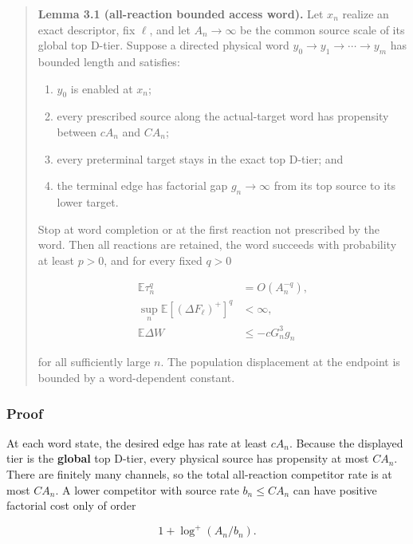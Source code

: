 \begin{quote}
\textbf{Lemma 3.1 (all-reaction bounded access word).} Let \(x_n\)
realize an exact descriptor, fix \(\ell\), and let \(A_n\to\infty\) be
the common source scale of its global top D-tier. Suppose a directed
physical word \(y_0\to y_1\to\cdots\to y_m\) has bounded length and
satisfies:

\begin{enumerate}
\def\labelenumi{\arabic{enumi}.}
\tightlist
\item
  \(y_0\) is enabled at \(x_n\);
\item
  every prescribed source along the actual-target word has propensity
  between \(cA_n\) and \(CA_n\);
\item
  every preterminal target stays in the exact top D-tier; and
\item
  the terminal edge has factorial gap \(g_n\to\infty\) from its top
  source to its lower target.
\end{enumerate}

Stop at word completion or at the first reaction not prescribed by the
word. Then all reactions are retained, the word succeeds with
probability at least \(p>0\), and for every fixed \(q>0\)

\[
\begin{aligned}
 \mathbb E\tau_n^q&=O(A_n^{-q}),\\
 \sup_n\mathbb E[(\Delta F_\ell)^+]^q&<\infty,\\
 \mathbb E\Delta W&\le-cG_n^3g_n
\end{aligned}                                      \tag{3.1}
\]

for all sufficiently large \(n\). The population displacement at the
endpoint is bounded by a word-dependent constant.
\end{quote}

\subsubsection{Proof}

At each word state, the desired edge has rate at least \(cA_n\). Because
the displayed tier is the \textbf{global} top D-tier, every physical
source has propensity at most \(CA_n\). There are finitely many
channels, so the total all-reaction competitor rate is at most \(CA_n\).
A lower competitor with source rate \(b_n\le CA_n\) can have positive
factorial cost only of order

\[
 1+\log^+(A_n/b_n).                                   \tag{3.2}
\]


